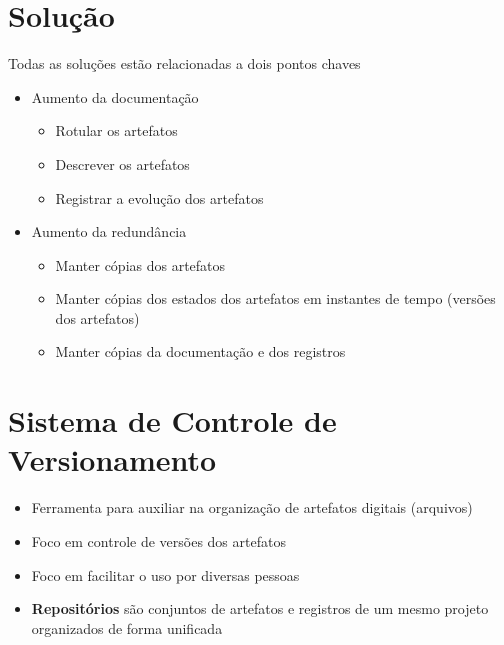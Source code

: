 \documentclass{beamer}
\newenvironment{slide}{\begin{frame}{\insertsection}}{\end{frame}}
\begin{document}
\section{Solução}
\begin{slide}
    Todas as soluções estão relacionadas a dois pontos chaves
    \begin{itemize}
        \pause
        \item Aumento da documentação
        \begin{itemize}
            \pause
            \item Rotular os artefatos
            \pause
            \item Descrever os artefatos
            \pause
            \item Registrar a evolução dos artefatos
        \end{itemize}
        \pause
        \item Aumento da redundância
        \begin{itemize}
            \pause
            \item Manter cópias dos artefatos
            \pause
            \item Manter cópias dos estados dos artefatos em instantes de tempo
                \pause (versões dos artefatos)
            \pause
            \item Manter cópias da documentação e dos registros
        \end{itemize}
    \end{itemize}
\end{slide}

\section{Sistema de Controle de Versionamento}
\begin{slide}
    \begin{itemize}
        \item Ferramenta para auxiliar na organização de artefatos digitais
            \pause (arquivos)
        \pause
        \item Foco em controle de versões dos artefatos
        \pause
        \item Foco em facilitar o uso por diversas pessoas
        \pause
        \item \textbf{Repositórios} são conjuntos de artefatos e registros de um
            mesmo projeto organizados de forma unificada
    \end{itemize}
\end{slide}
\end{document}
